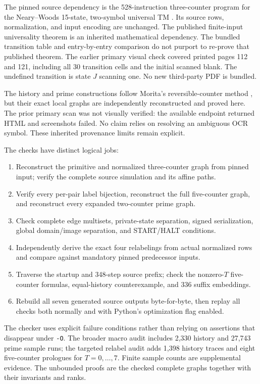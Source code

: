 \documentclass[11pt,a4paper]{article}
\numberwithin{equation}{section}
\newcommand{\code}[1]{\texttt{\small #1}}
\begin{document}
The pinned source dependency is the 528-instruction three-counter program
for the Neary--Woods 15-state, two-symbol universal TM \cite{fpa:nw}.
Its source rows, normalization, and input encoding are unchanged. The
published finite-input universality theorem is an inherited mathematical
dependency. The bundled transition table and entry-by-entry comparison do
not purport to re-prove that published theorem. The earlier primary visual
check covered printed pages 112 and 121, including all 30 transition cells
and the initial scanned blank. The undefined transition is state $J$
scanning one. No new third-party PDF is bundled.

The history and prime constructions follow Morita's reversible-counter
method \cite{fpa:morita1996}, but their exact local graphs are independently
reconstructed and proved here. The prior primary scan was not visually
verified: the available endpoint returned HTML and screenshots failed.
No claim relies on resolving an ambiguous OCR symbol. These inherited
provenance limits remain explicit.

The checks have distinct logical jobs:
\begin{enumerate}
\item Reconstruct the primitive and normalized three-counter graph from
pinned input; verify the complete source simulation and its affine paths.
\item Verify every per-pair label bijection, reconstruct the full
five-counter graph, and reconstruct every expanded two-counter prime graph.
\item Check complete edge multisets, private-state separation, signed
serialization, global domain/image separation, and START/HALT conditions.
\item Independently derive the exact four relabelings from actual normalized
rows and compare against mandatory pinned predecessor inputs.
\item Traverse the startup and 348-step source prefix; check the nonzero-$T$
five-counter formulas, equal-history counterexample, and 336 suffix embeddings.
\item Rebuild all seven generated source outputs byte-for-byte, then replay
all checks both normally and with Python's optimization flag enabled.
\end{enumerate}
The checker uses explicit failure conditions rather than relying on
assertions that disappear under \code{-O}. The broader macro audit includes
2,330 history and 27,743 prime sample runs; the targeted relabel audit adds
1,398 history traces and eight five-counter prologues for $T=0,\ldots,7$.
Finite sample counts are supplemental evidence. The unbounded proofs are
the checked complete graphs together with their invariants and ranks.
\end{document}
